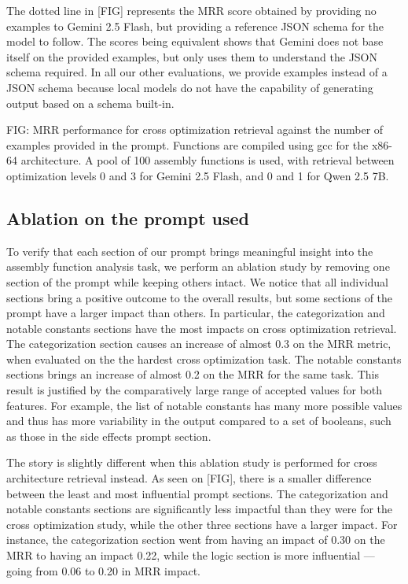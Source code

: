 \documentclass[conference,compsoc]{IEEEtran}
\begin{document}
The dotted line in [FIG] represents the MRR score obtained by providing no examples to Gemini 2.5 Flash, but providing a reference JSON
schema for the model to follow. The scores being equivalent shows that Gemini does not base itself on the provided examples, but only
uses them to understand the JSON schema required. In all our other evaluations, we provide examples instead of a JSON schema because local
models do not have the capability of generating output based on a schema built-in.

FIG: MRR performance for cross optimization retrieval against the number of examples provided in the prompt. Functions are compiled
using gcc for the x86-64 architecture. A pool of 100 assembly functions is used, with retrieval between optimization levels 0 and 3
for Gemini 2.5 Flash, and 0 and 1 for Qwen 2.5 7B.

\subsection{Ablation on the prompt used}

To verify that each section of our prompt brings meaningful insight into the assembly function analysis task, we perform an ablation
study by removing one section of the prompt while keeping others intact. We notice that all individual sections bring a positive
outcome to the overall results, but some sections of the prompt have a larger impact than others. In particular, the categorization and
notable constants sections have the most impacts on cross optimization retrieval. The categorization section causes an increase of almost
0.3 on the MRR metric, when evaluated on the the hardest cross optimization task. The notable constants sections brings an increase of
almost 0.2 on the MRR for the same task. This result is justified by the comparatively large range of accepted values for both features.
For example, the list of notable constants has many more possible values and thus has more variability in the output compared to a set
of booleans, such as those in the side effects prompt section.

The story is slightly different when this ablation study is performed for cross architecture retrieval instead. As seen on [FIG],
there is a smaller difference between the least and most influential prompt sections. The categorization and notable constants sections
are significantly less impactful than they were for the cross optimization study, while the other three sections have a larger impact.
For instance, the categorization section went from having an impact of 0.30 on the MRR to having an impact 0.22, while the logic
section is more influential --- going from 0.06 to 0.20 in MRR impact.
\end{document}
